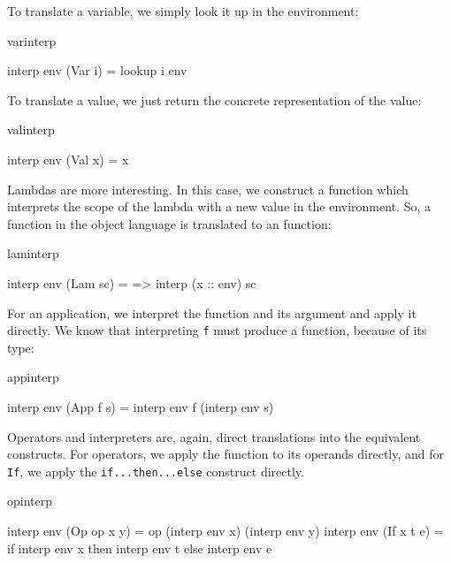 \noindent
To translate a variable, we simply look it up in the environment:

\begin{SaveVerbatim}{varinterp}

interp env (Var i) = lookup i env

\end{SaveVerbatim}

\noindent
To translate a value, we just return the concrete representation of the value:

\begin{SaveVerbatim}{valinterp}

interp env (Val x) = x

\end{SaveVerbatim}

\noindent
Lambdas are more interesting. In this case, we construct a function which
interprets the scope of the lambda with a new value in the environment. So, a
function in the object language is translated to an \Idris{} function:

\begin{SaveVerbatim}{laminterp}

interp env (Lam sc) = \x => interp (x :: env) sc

\end{SaveVerbatim}

\noindent
For an application, we interpret the function and its argument and apply it
directly. We know that interpreting \texttt{f} must produce a function, because of its
type:

\begin{SaveVerbatim}{appinterp}

interp env (App f s) = interp env f (interp env s)

\end{SaveVerbatim}

\noindent
Operators and interpreters are, again, direct translations into the equivalent
\Idris{} constructs. For operators, we apply the function to its operands directly,
and for \texttt{If}, we apply the \Idris{} \texttt{if...then...else} construct
directly.

\begin{SaveVerbatim}{opinterp}

interp env (Op op x y) = op (interp env x) (interp env y)
interp env (If x t e)  = if interp env x then interp env t 
                                         else interp env e

\end{SaveVerbatim}

